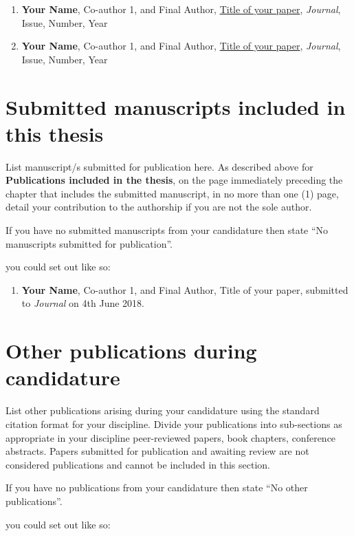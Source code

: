 \begin{enumerate}

\item \cite{citationkey} \textbf{Your Name}, Co-author 1, and Final Author, \href{linktoyourpaper}{Title of your paper}, \textit{Journal}, Issue, Number, Year

\item \cite{citationkey} \textbf{Your Name}, Co-author 1, and Final Author, \href{linktoyourpaper}{Title of your paper}, \textit{Journal}, Issue, Number, Year

\end{enumerate}

\section*{Submitted manuscripts included in this thesis}

\begin{instructional}
	List manuscript/s submitted for publication here. As described above for \textbf{Publications included in the thesis}, on the page immediately preceding the chapter that includes the submitted manuscript, in no more than one (1) page, detail your contribution to the authorship if you are not the sole author.

If you have no submitted manuscripts from your candidature then state ``No manuscripts submitted for publication''.

\eg{} you could set out like so:
\end{instructional}

\begin{enumerate}

\item \cite{citationkey} \textbf{Your Name}, Co-author 1, and Final Author, Title of your paper, submitted to \textit{Journal} on 4th June 2018.

\end{enumerate}

\section*{Other publications during candidature}

\begin{instructional}
List other publications arising during your candidature using the standard citation format for your discipline. Divide your publications into sub-sections as appropriate in your discipline \eg{} peer-reviewed papers, book chapters, conference abstracts. Papers submitted for publication and awaiting review are not considered publications and cannot be included in this section.

If you have no publications from your candidature then state ``No other publications''.

\eg{} you could set out like so:
\end{instructional}

